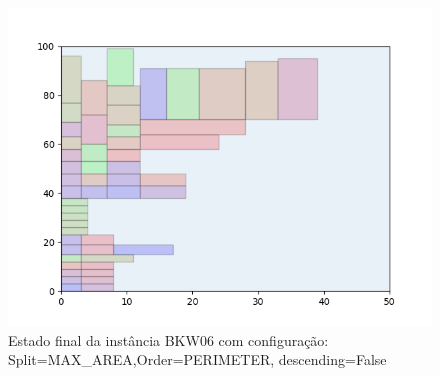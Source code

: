 \begin{figure}[H]
    \centering
    \caption[]{Estado final da instância BKW06 com configuração: Split=MAX_AREA,Order=PERIMETER, descending=False}
    \label{fig:bkw06-max_area-perimeter-false}
    \includegraphics[scale=0.5]{output/figures/bkw/bkw06/max_area/perimeter/false/00}
\end{figure}